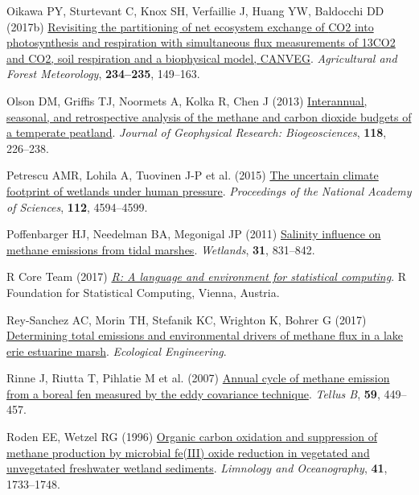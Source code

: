 \documentclass[
  12pt,
]{article}
\newlength{\cslhangindent}
\newenvironment{CSLReferences}[2] %
 {\begin{list}{}{%
  \setlength{\itemindent}{0pt}
  \setlength{\leftmargin}{0pt}
  \setlength{\parsep}{0pt}
  \ifodd #1
   \setlength{\leftmargin}{\cslhangindent}
   \setlength{\itemindent}{-1\cslhangindent}
  \fi
  \setlength{\itemsep}{#2\baselineskip}}}
 {\end{list}}
\begin{document}
\begin{CSLReferences}{1}{0}
Oikawa PY, Sturtevant C, Knox SH, Verfaillie J, Huang YW, Baldocchi DD
(2017b)
\href{https://doi.org/10.1016/j.agrformet.2016.12.016}{Revisiting the
partitioning of net ecosystem exchange of {CO}2 into photosynthesis and
respiration with simultaneous flux measurements of 13CO2 and {CO}2, soil
respiration and a biophysical model, {CANVEG}}. \emph{Agricultural and
Forest Meteorology}, \textbf{234--235}, 149--163.

Olson DM, Griffis TJ, Noormets A, Kolka R, Chen J (2013)
\href{https://doi.org/10.1002/jgrg.20031}{Interannual, seasonal, and
retrospective analysis of the methane and carbon dioxide budgets of a
temperate peatland}. \emph{Journal of Geophysical Research:
Biogeosciences}, \textbf{118}, 226--238.

Petrescu AMR, Lohila A, Tuovinen J-P et al. (2015)
\href{https://doi.org/10.1073/pnas.1416267112}{The uncertain climate
footprint of wetlands under human pressure}. \emph{Proceedings of the
National Academy of Sciences}, \textbf{112}, 4594--4599.

Poffenbarger HJ, Needelman BA, Megonigal JP (2011)
\href{https://doi.org/10.1007/s13157-011-0197-0}{Salinity influence on
methane emissions from tidal marshes}. \emph{Wetlands}, \textbf{31},
831--842.

R Core Team (2017) \emph{\emph{\href{https://www.R-project.org/}{R: A
language and environment for statistical computing}}}. R Foundation for
Statistical Computing, Vienna, Austria.

Rey-Sanchez AC, Morin TH, Stefanik KC, Wrighton K, Bohrer G (2017)
\href{https://doi.org/10.1016/j.ecoleng.2017.06.042}{Determining total
emissions and environmental drivers of methane flux in a lake erie
estuarine marsh}. \emph{Ecological Engineering}.

Rinne J, Riutta T, Pihlatie M et al. (2007)
\href{https://doi.org/10.1111/j.1600-0889.2007.00261.x}{Annual cycle of
methane emission from a boreal fen measured by the eddy covariance
technique}. \emph{Tellus B}, \textbf{59}, 449--457.

Roden EE, Wetzel RG (1996)
\href{https://doi.org/10.4319/lo.1996.41.8.1733}{Organic carbon
oxidation and suppression of methane production by microbial fe({III})
oxide reduction in vegetated and unvegetated freshwater wetland
sediments}. \emph{Limnology and Oceanography}, \textbf{41}, 1733--1748.


\end{CSLReferences}
\end{document}
